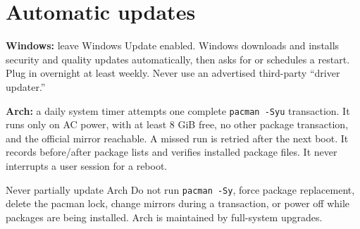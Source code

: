 \section{Automatic updates}

\textbf{Windows:} leave Windows Update enabled. Windows downloads and installs
security and quality updates automatically, then asks for or schedules a
restart. Plug in overnight at least weekly. Never use an advertised
third-party ``driver updater.''

\textbf{Arch:} a daily system timer attempts one complete
\texttt{pacman -Syu} transaction. It runs only on AC power, with at least
8 GiB free, no other package transaction, and the official mirror reachable.
A missed run is retried after the next boot. It records before/after package
lists and verifies installed package files. It never interrupts a user session
for a reboot.

\begin{center}
\end{center}


\begin{gate}{Never partially update Arch}
Do not run \texttt{pacman -Sy}, force package replacement, delete the pacman
lock, change mirrors during a transaction, or power off while packages are
being installed. Arch is maintained by full-system upgrades.
\end{gate}

